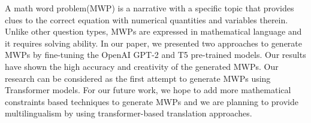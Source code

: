 A math word problem(MWP) is a narrative with a specific topic that provides clues to the correct equation with numerical quantities and variables therein. Unlike other question types, MWPs are expressed in mathematical language and it requires solving ability. In our paper, we presented two approaches to generate MWPs by fine-tuning the OpenAI GPT-2 and T5 pre-trained models.  Our results have shown the high accuracy and creativity of the generated MWPs. Our research can be considered as the first attempt to generate MWPs using Transformer models. For our future work, we hope to add more mathematical constraints based techniques to generate MWPs and we are planning to provide multilingualism by using transformer-based translation approaches.
